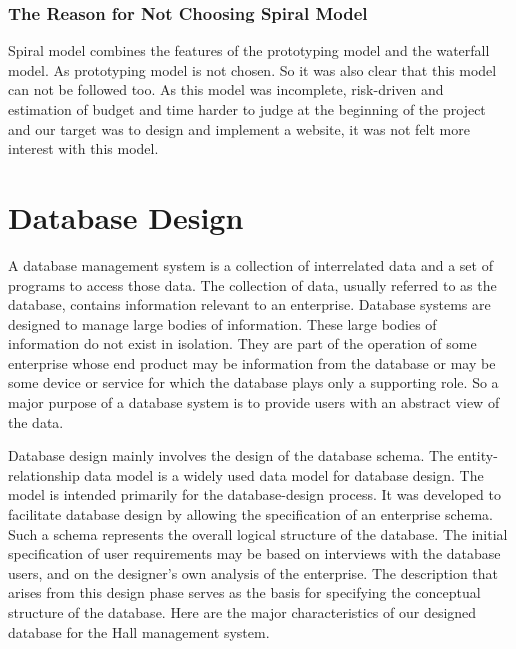 \subsubsection{The Reason for Not Choosing Spiral Model\newline}
Spiral model combines the features of the prototyping model and
the waterfall model. As prototyping model is not chosen. So it was
also clear that this model can not be followed too. As this model
was incomplete, risk-driven and estimation of budget and time
harder to judge at the beginning of the project and our target was
to design and implement a website, it was not felt more interest
with this model.


\section{Database Design}
A database management system is a collection of interrelated data
and a set of programs to access those data. The collection of
data, usually referred to as the database, contains information
relevant to an enterprise. Database systems are designed to manage
large bodies of information. These large bodies of information do
not exist in isolation.
 They are part of the operation of some enterprise whose end product may be information from the database or may be some device or service for which the database plays only a supporting role.
  \citep{silberchatz2006sistema} So a major purpose of a database system is to provide users with an abstract view of the data.

Database design mainly involves the design of the database schema.
The entity-relationship data model is a widely used data model for
database design. The model is intended primarily for the
database-design process. It was developed to facilitate database
design by allowing the specification of an enterprise schema. Such
a schema represents the overall logical structure of the database.
The initial specification of user requirements may be based on
interviews with the database users, and on the designer's own
analysis of the enterprise. The description that arises from this
design phase serves as the basis for specifying the conceptual
structure of the database. Here are the major characteristics of
our designed database for the Hall management system.
